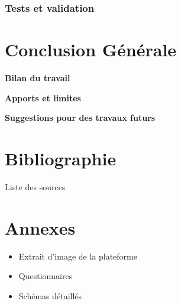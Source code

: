 \documentclass[12pt,a4paper,oneside]{memoir}
\let\cleardoublepage\clearpage
\begin{document}
	\subsection{Tests et validation}
	
	\chapter*{Conclusion Générale}
	
	\textbf{Bilan du travail}
	
	\textbf{Apports et limites}
	
	\textbf{Suggestions pour des travaux futurs}
	
	\chapter*{Bibliographie}
	Liste des sources
	
	\chapter*{Annexes}
	\begin{itemize}
		\item Extrait d'image de la plateforme
		\item Questionnaires
		\item Schémas détaillés
	\end{itemize}
	
	\cleardoublepage
	\renewcommand{\contentsname}{Table des matières}
	\setcounter{tocdepth}{3} %
	\tableofcontents
	
\end{document}
